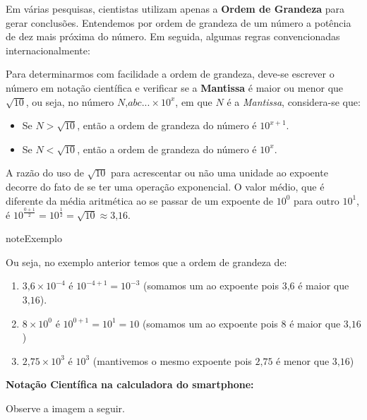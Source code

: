 Em várias pesquisas, cientistas utilizam apenas a \textbf{Ordem de Grandeza} para gerar conclusões. Entendemos por ordem de grandeza de um número a potência de dez mais próxima do número. Em seguida, algumas regras convencionadas internacionalmente:

Para determinarmos com facilidade a ordem de grandeza, deve-se escrever o número em notação científica e verificar se a \textbf{Mantissa} é maior ou menor que \(\sqrt{10}\), ou seja, no número \(N\text{,}abc... \times 10^x\), em que \(N\) é a \textit{Mantissa}, considera-se que:
\begin{itemize}
\item {} 
Se \(N > \sqrt{10}\), então a ordem de grandeza do número é \(10^{x+1}\).

\item {} 
Se \(N < \sqrt{10}\), então a ordem de grandeza do número é \(10^x\).

\end{itemize}

A razão do uso de \(\sqrt{10}\) para acrescentar ou não uma unidade ao expoente decorre do fato de se ter uma operação exponencial. O valor médio, que é diferente da média aritmética ao se passar de um expoente de \(10^0\) para outro \(10^1\), é \({10}^\frac{0+1}{2}{=10}^\frac{1}{2}=\sqrt{10} \approx 3\text{,}16\).

\begin{sphinxadmonition}{note}{Exemplo}

Ou seja, no exemplo anterior temos que a ordem de grandeza de:
\begin{enumerate}
\item {} 
\(3\text{,}6 \times 10^{-4}\)  é  \(10^{-4+1} = 10^{-3}\) (somamos um ao expoente pois \(3\text{,}6\) é maior que \(3\text{,}16\)).

\item {} 
\(8 \times 10^0\) é  \(10^{0+1} = 10^1 = 10\) (somamos um ao expoente pois \(8\) é maior que \(3\text{,}16\))

\item {} 
\(2\text{,}75 \times 10^3\) é \(10^3\)  (mantivemos o mesmo expoente pois \(2\text{,}75\) é menor que \(3\text{,}16\))

\end{enumerate}
\end{sphinxadmonition}

\textbf{Notação Científica na calculadora do smartphone:}

Observe a imagem a seguir.

